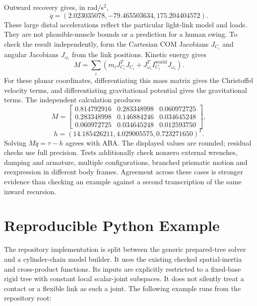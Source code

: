 Outward recovery gives, in rad/s$^2$,
\begin{equation}
 \ddot q=(2.023035078,-79.465503634,175.204404572).
\end{equation}
These large distal accelerations reflect the particular light-link model and loads. They are not plausible-muscle bounds or a prediction for a human swing. To check the result independently, form the Cartesian COM Jacobians $J_{C_i}$ and angular Jacobians $J_{\omega_i}$ from the link positions. Kinetic energy gives
\begin{equation}
 M=\sum_i\left(m_iJ_{C_i}^TJ_{C_i}+J_{\omega_i}^T I_{C_i}^{\mathrm{world}}J_{\omega_i}\right).
\end{equation}
For these planar coordinates, differentiating this mass matrix gives the Christoffel velocity terms, and differentiating gravitational potential gives the gravitational terms. The independent calculation produces
\begin{equation}
 M=\begin{bmatrix}
 0.814792916&0.283348998&0.060972725\\
 0.283348998&0.146884246&0.034645248\\
 0.060972725&0.034645248&0.012593750
 \end{bmatrix},
\end{equation}
\begin{equation}
 h=(14.185426211,4.029005575,0.723271650)^T.
\end{equation}
Solving $M\ddot q=\tau-h$ agrees with ABA. The displayed values are rounded; residual checks use full precision. Tests additionally check nonzero external wrenches, damping and armature, multiple configurations, branched prismatic motion and reexpression in different body frames. Agreement across these cases is stronger evidence than checking an example against a second transcription of the same inward recursion.

\section{Reproducible Python Example}
\label{sec:python_aba_example}

The repository implementation is split between the generic prepared-tree solver and a cylinder-chain model builder. It uses the existing checked spatial-inertia and cross-product functions. Its inputs are explicitly restricted to a fixed-base rigid tree with constant local scalar-joint subspaces. It does not silently treat a contact or a flexible link as such a joint. The following example runs from the repository root:

